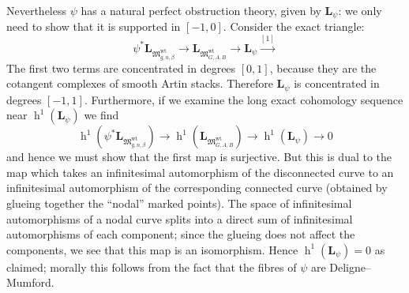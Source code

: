 \documentclass[11pt]{amsart}
\renewcommand{\to}{\rightarrow}
\newcommand{\LL}{\mathbf{L}}
\newcommand{\MM}{\mathfrak M}
\newcommand{\h}{\operatorname{h}}
\theoremstyle{definition}
\theoremstyle{definition}
\begin{document}
\begin{center}
\end{center}
Nevertheless $\psi$ has a natural perfect obstruction theory, given by $\LL_{\psi}$: we only need to show that it is supported in $[-1,0]$. Consider the exact triangle:
\begin{equation*} \psi^* \LL_{\MM_{g,n,\beta}^{\operatorname{wt}}} \to \LL_{\MM_{G,A,B}^{\operatorname{wt}}} \to \LL_\psi \xrightarrow{[1]} \end{equation*}
The first two terms are concentrated in degrees $[0,1]$, because they are the cotangent complexes of smooth Artin stacks. Therefore $\LL_\psi$ is concentrated in degrees $[-1,1]$. Furthermore, if we examine the long exact cohomology sequence near $\h^1(\LL_\psi)$ we find
\begin{equation*} \h^1(\psi^* \LL_{\MM_{g,n,\beta}^{\operatorname{wt}}}) \to \h^1(\LL_{\MM_{G,A,B}^{\operatorname{wt}}}) \to \h^1(\LL_\psi) \to 0 \end{equation*}
and hence we must show that the first map is surjective. But this is dual to the map which takes an infinitesimal automorphism of the disconnected curve to an infinitesimal automorphism of the corresponding connected curve (obtained by glueing together the ``nodal'' marked points). The space of infinitesimal automorphisms of a nodal curve splits into a direct sum of infinitesimal automorphisms of each component; since the glueing does not affect the components, we see that this map is an isomorphism. Hence $\h^1(\LL_\psi) = 0$ as claimed; morally this follows from the fact that the fibres of $\psi$ are Deligne--Mumford.
\end{document}
